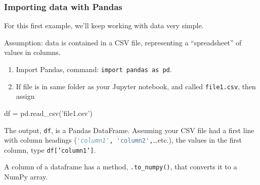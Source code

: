 \documentclass{beamer}
\newenvironment{codeblock}
    {\hfill\begin{beamerboxesrounded}[lower=codecol, width=0.8\textwidth]
    \medskip

    }
    { 
    \end{beamerboxesrounded}\hfill
    }
\theoremstyle{example}
\newcommand{\ct}[1]{\lstinline[language=Python]!#1!}
\newcommand{\ttt}[1]{{\small\texttt{#1}}}
\begin{document}
\begin{frame}[fragile]
    \frametitle{Importing data with Pandas}
For this first example, we'll keep working with data very simple. 

Assumption: data is contained in a CSV file, representing a ``spreadsheet'' of values in columns.

\begin{enumerate}
    \item Import Pandas, command: \ttt{import pandas as pd}.
    \item If file is in same folder as your Jupyter notebook, and called \ttt{file1.csv}, then assign 
\end{enumerate}

\begin{codeblock}

\begin{python}[numbers=none]
df = pd.read_csv('file1.csv')
\end{python}

\end{codeblock}

The output, \ttt{df}, is a Pandas DataFrame. Assuming your CSV file had a first line with column headings (\ct{'column1', 'column2',}\ldots etc.), the values in the first column, type \ttt{df['column1']}.

A column of a dataframe has a method, \ct{.to_numpy()}, that converts it to a NumPy array.
\end{frame}
\end{document}
